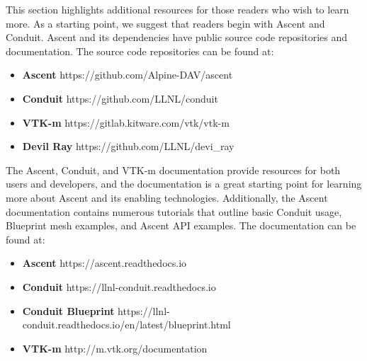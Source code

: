This section highlights additional resources for those readers who
wish to learn more.
%
As a starting point, we suggest that readers begin with Ascent and
Conduit.
%
Ascent and its dependencies have public source code repositories and
documentation.
%
The source code repositories can be found at:
\begin{itemize}
  \item \textbf{Ascent} https://github.com/Alpine-DAV/ascent
  \item \textbf{Conduit} https://github.com/LLNL/conduit
  \item \textbf{VTK-m} https://gitlab.kitware.com/vtk/vtk-m
  \item \textbf{Devil Ray} https://github.com/LLNL/devi\_ray
\end{itemize}

The Ascent, Conduit, and VTK-m documentation provide resources for both users and
developers, and the documentation is a great starting point for learning more about
Ascent and its enabling technologies.
%
Additionally, the Ascent documentation contains numerous tutorials that
outline basic Conduit usage, Blueprint mesh examples, and Ascent API examples.
The documentation can be found at:
\begin{itemize}
  \item \textbf{Ascent} https://ascent.readthedocs.io
  \item \textbf{Conduit} https://llnl-conduit.readthedocs.io
  \item \textbf{Conduit Blueprint} https://llnl-conduit.readthedocs.io/en/latest/blueprint.html 
  \item \textbf{VTK-m} http://m.vtk.org/documentation
\end{itemize}
